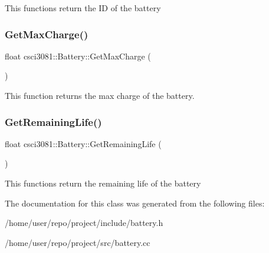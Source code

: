 This functions return the ID of the battery \mbox{\label{classcsci3081_1_1Battery_af9e2a6131a7a1a0db66b95a3610e7db2}} 
\subsubsection{\texorpdfstring{Get\+Max\+Charge()}{GetMaxCharge()}}
{\footnotesize\ttfamily float csci3081\+::\+Battery\+::\+Get\+Max\+Charge (\begin{DoxyParamCaption}{ }\end{DoxyParamCaption})}

This function returns the max charge of the battery. \mbox{\label{classcsci3081_1_1Battery_a6233a4d2c5c11d9db3db41db3c3c675c}} 
\subsubsection{\texorpdfstring{Get\+Remaining\+Life()}{GetRemainingLife()}}
{\footnotesize\ttfamily float csci3081\+::\+Battery\+::\+Get\+Remaining\+Life (\begin{DoxyParamCaption}{ }\end{DoxyParamCaption})}

This functions return the remaining life of the battery 

The documentation for this class was generated from the following files\+:\begin{DoxyCompactItemize}
\item 
/home/user/repo/project/include/battery.\+h\item 
/home/user/repo/project/src/battery.\+cc\end{DoxyCompactItemize}
